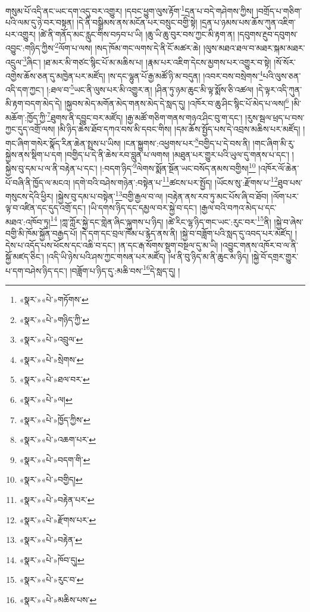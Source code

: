 གསུམ་པོ་འདི་ནང་ཡང་དག་འདུ་བར་འགྱུར། །དབང་ཕྱུག་ལུས་རྟོག་\footnote{«སྣར་»«པེ་»གཏོགས་}དྲན་པ་བདེ་གཤེགས་ཀྱིས། །བགྲོད་པ་གཅིག་པའི་ལམ་དུ་ཉེ་བར་བསྟན། །དེ་ནི་བསྒྲིམས་ནས་མངོན་པར་བསྲུང་བགྱི་སྟེ། །དྲན་པ་ཉམས་པས་ཆོས་ཀུན་འཇིག་པར་འགྱུར། །ཚེ་ནི་གནོད་མང་རླུང་གིས་བཏབ་པ་ཡི། །ཆུ་ཡི་ཆུ་བུར་བས་ཀྱང་མི་རྟག་ན། །དབུགས་རྔུབ་དབུགས་འབྱུང་:གཉིད་ཀྱིས་\footnote{«སྣར་»«པེ་»གཉིད་ཀྱི་}ལོག་པ་ལས། །སད་ཁོམ་གང་ལགས་དེ་ནི་ངོ་མཚར་ཆེ། །ལུས་མཐའ་ཐལ་བ་མཐར་སྐམ་མཐར་འདྲུལ་\footnote{«སྣར་»«པེ་»འབྲུལ་}ཞིང་། །ཐ་མར་མི་གཙང་སྙིང་པོ་མ་མཆིས་པ། །རྣམ་པར་འཇིག་དེངས་མྱགས་པར་འགྱུར་བ་སྟེ། །སོ་སོར་འགྱེས་ཆོས་ཅན་དུ་མཁྱེན་པར་མཛོད། །ས་དང་ལྷུན་པོ་རྒྱ་མཚོ་ཉི་མ་བདུན། །འབར་བས་བསྲེགས་\footnote{«སྣར་»«པེ་»སྲེགས་}པའི་ལུས་ཅན་འདི་དག་ཀྱང་། །:ཐལ་བ་\footnote{«སྣར་»«པེ་»ཐལ་བར་}ཡང་ནི་ལུས་པར་མི་འགྱུར་ན། །ཤིན་ཏུ་ཉམ་ཆུང་མི་ལྟ་སྨོས་ཅི་འཚལ། །དེ་ལྟར་འདི་ཀུན་མི་རྟག་བདག་མེད་དེ། །སྐྱབས་མེད་མགོན་མེད་གནས་མེད་དེ་སླད་དུ། །འཁོར་བ་ཆུ་ཤིང་སྙིང་པོ་མེད་པ་ལས།\footnote{«སྣར་»«པེ་»ལ།} །མི་མཆོག་:ཁྱོད་ཀྱི་\footnote{«སྣར་»«པེ་»ཁྱོད་ཀྱིས་}ཐུགས་ནི་དབྱུང་བར་མཛོད། །རྒྱ་མཚོ་གཅིག་གནས་གཉའ་ཤིང་བུ་ག་དང་། །རུས་སྦལ་ཕྲད་པ་བས་ཀྱང་དུད་འགྲོ་ལས། །མི་ཉིད་ཆེས་ཐོབ་དཀའ་བས་མི་དབང་གིས། །དམ་ཆོས་སྤྱོད་པས་དེ་འབྲས་མཆིས་པར་མཛོད། །གང་ཞིག་གསེར་སྣོད་རིན་ཆེན་སྤྲས་པ་ཡིས། །ངན་སྐྱུགས་:འཕྱགས་པར་\footnote{«སྣར་»«པེ་»འཆག་པར་}བགྱིད་པ་དེ་བས་ནི། །གང་ཞིག་མི་རུ་སྐྱེས་ནས་སྡིག་པ་དག །བགྱིད་པ་དེ་ནི་ཆེས་རབ་བླུན་པ་ལགས། །མཐུན་པར་གྱུར་པའི་ཡུལ་དུ་གནས་པ་དང་། །སྐྱེས་བུ་དམ་པ་ལ་ནི་བརྟེན་པ་དང་། །:བདག་ཉིད་\footnote{«སྣར་»«པེ་»བདག་གི་}ལེགས་སྨོན་སྔོན་ཡང་བསོད་ནམས་བགྱིས།\footnote{«སྣར་»«པེ་»བགྱིད།} །འཁོར་ལོ་ཆེན་པོ་བཞི་ནི་ཁྱོད་ལ་མངའ། །དགེ་བའི་བཤེས་གཉེན་:བསྟེན་པ་\footnote{«སྣར་»«པེ་»བརྟེན་པར་}ཚངས་པར་སྤྱོད། །ཡོངས་སུ་:རྫོགས་པ་\footnote{«སྣར་»«པེ་»རྫོགས་པར་}ཐུབ་པས་གསུངས་དེའི་ཕྱིར། །སྐྱེས་བུ་དམ་པ་བསྟེན་\footnote{«སྣར་»«པེ་»བརྟེན་}བགྱི་རྒྱལ་བ་ལ། །བརྟེན་ནས་རབ་ཏུ་མང་པོས་ཞི་བ་ཐོབ། །ལོག་པར་ལྟ་བ་འཛིན་དང་དུད་འགྲོ་དང་། །ཡི་དགས་ཉིད་དང་དམྱལ་བར་སྐྱེ་བ་དང་། །རྒྱལ་བའི་བཀའ་མེད་པ་དང་མཐའ་:འཁོབ་ཏུ།\footnote{«སྣར་»«པེ་»ཁོབ་དུ།} །ཀླ་ཀློར་སྐྱེ་དང་གླེན་ཞིང་ལྐུགས་པ་ཉིད། །ཚེ་རིང་ལྷ་ཉིད་གང་ཡང་:རུང་བར་\footnote{«སྣར་»«པེ་»རུང་བ་}ནི། །སྐྱེ་བ་ཞེས་བགྱི་མི་ཁོམ་སྐྱོན་བརྒྱད་པོ། །དེ་དག་དང་བྲལ་ཁོམ་པ་རྙེད་ནས་ནི། །སྐྱེ་བ་བཟློག་པའི་སླད་དུ་འབད་པར་མཛོད། །དེས་པ་འདོད་པས་ཕོངས་དང་འཆི་བ་དང་། །ན་དང་རྒ་སོགས་སྡུག་བསྔལ་དུ་མ་ཡི། །འབྱུང་གནས་འཁོར་བ་ལ་ནི་སྐྱོ་མཛད་ཅིང་། །འདི་ཡི་ཉེས་པའི་ཤས་ཀྱང་གསན་པར་མཛོད། །ཕ་ནི་བུ་ཉིད་མ་ནི་ཆུང་མ་ཉིད། །སྐྱེ་བོ་དགྲར་གྱུར་པ་དག་བཤེས་ཉིད་དང་། །བཟློག་པ་ཉིད་དུ་:མཆི་བས་\footnote{«སྣར་»«པེ་»མཆིས་པས་}དེ་སླད་དུ། །
